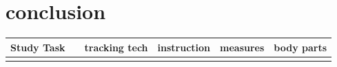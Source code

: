 \section{conclusion}
\begin{table}[]
	\begin{tabular}{|l|l|l|l|l|l|}
		\hline
		Study Task &  & tracking tech & instruction & measures & body parts  \\ \hline
		&  &  &  &  &  \\ \hline
	\end{tabular}
\end{table}

